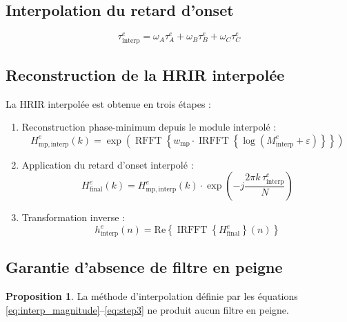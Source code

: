 \documentclass[12pt, a4paper]{article}
\theoremstyle{definition}
\newtheorem{proposition}{Proposition}[section]
\DeclareMathOperator{\irfft}{IRFFT}
\DeclareMathOperator{\rfft}{RFFT}
\begin{document}
\subsection{Interpolation du retard d'onset}

\begin{equation}
  \tau_{\mathrm{interp}}^e = \omega_A \tau_A^e + \omega_B \tau_B^e
  + \omega_C \tau_C^e
  \label{eq:interp_delay}
\end{equation}

\subsection{Reconstruction de la HRIR interpolée}

La HRIR interpolée est obtenue en trois étapes :

\begin{enumerate}
  \item Reconstruction phase-minimum depuis le module interpolé :
  \begin{equation}
    H_{\mathrm{mp,interp}}^e(k)
      = \exp\!\left(\rfft\!\left\{w_{\mathrm{mp}} \cdot
        \irfft\!\left\{\log(M_{\mathrm{interp}}^e + \varepsilon)\right\}
        \right\}\right)
    \label{eq:step1}
  \end{equation}

  \item Application du retard d'onset interpolé :
  \begin{equation}
    H_{\mathrm{final}}^e(k)
      = H_{\mathrm{mp,interp}}^e(k)
        \cdot \exp\!\!\left(-j\frac{2\pi k\,\tau_{\mathrm{interp}}^e}{N}\right)
    \label{eq:step2}
  \end{equation}

  \item Transformation inverse :
  \begin{equation}
    h_{\mathrm{interp}}^e(n) = \mathrm{Re}\!\left\{\irfft\!\left\{
      H_{\mathrm{final}}^e\right\}(n)\right\}
    \label{eq:step3}
  \end{equation}
\end{enumerate}

\subsection{Garantie d'absence de filtre en peigne}

\begin{proposition}
  La méthode d'interpolation définie par les équations
  \eqref{eq:interp_magnitude}--\eqref{eq:step3} ne produit aucun filtre
  en peigne.
\end{proposition}
\end{document}
